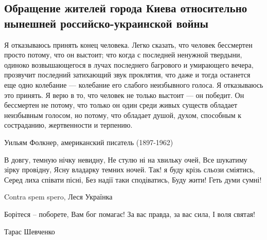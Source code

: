  
 
 
 
 

\subsection{Обращение жителей города Киева относительно нынешней российско-украинской войны}

\begin{zzquote}
Я отказываюсь принять конец человека. Легко сказать, что человек бессмертен
просто потому, что он выстоит; что когда с последней ненужной твердыни, одиноко
возвышающегося в лучах последнего багрового и умирающего вечера, прозвучит
последний затихающий звук проклятия, что даже и тогда останется еще одно
колебание — колебание его слабого неизбывного голоса. Я отказываюсь это
принять. Я верю в то, что человек не только выстоит — он победит. Он бессмертен
не потому, что только он один среди живых существ обладает неизбывным голосом,
но потому, что обладает душой, духом, способным к состраданию, жертвенности и
терпению.

Уильям Фолкнер, американский писатель (1897-1962)

В довгу, темную нічку невидну, Не стулю ні на хвильку очей,
Все шукатиму зірку провідну, Ясну владарку темних ночей.
Так! я буду крізь сльози сміятись, Серед лиха співати пісні,
Без надії таки сподіватись, Буду жити! Геть думи сумні! 

Contra spem spero, Леся Українка

Борітеся – поборете, Вам бог помагає! За вас правда, за вас сила, І воля святая!

Тарас Шевченко
\end{zzquote}


